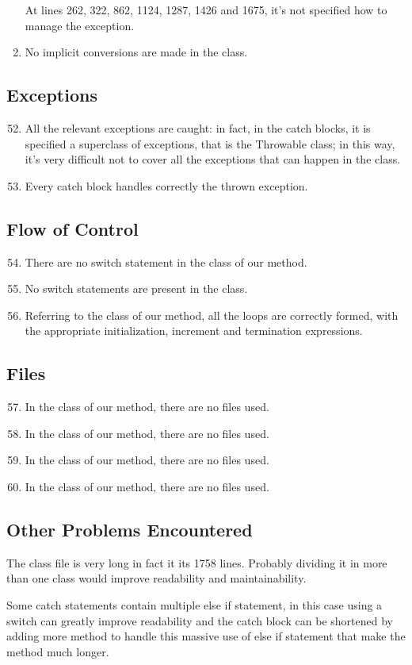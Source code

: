 \begin{enumerate}
    At lines 262, 322, 862, 1124, 1287, 1426 and 1675, it's not specified how to manage the exception.
	\item No implicit conversions are made in the class.
\end{enumerate}
\subsection{Exceptions}
\begin{enumerate}
	\setcounter{enumi}{51}
	\item All the relevant exceptions are caught: in fact, in the catch blocks, it is specified a superclass of exceptions, that is the Throwable class; in this way, it's very difficult not to cover all the exceptions that can happen in the class.
	\item Every catch block handles correctly the thrown exception.
\end{enumerate}
\subsection{Flow of Control}
\begin{enumerate}
	\setcounter{enumi}{53}
	\item There are no switch statement in the class of our method.
	\item No switch statements are present in the class.
	\item Referring to the class of our method, all the loops are correctly formed, with the appropriate initialization, increment and termination expressions.
\end{enumerate}
\subsection{Files}
\begin{enumerate}
	\setcounter{enumi}{56}
	\item In the class of our method, there are no files used.
	\item In the class of our method, there are no files used.
	\item In the class of our method, there are no files used.
	\item In the class of our method, there are no files used.
\end{enumerate}
\subsection{Other Problems Encountered}
	The class file is very long in fact it its 1758 lines. Probably dividing it in more than one class would improve readability and maintainability.
	
	Some catch statements contain multiple \ttfamily else if \normalfont statement, in this case using a switch can greatly improve readability and the catch block can be shortened by adding more method to handle this massive use of else if statement that make the method much longer.